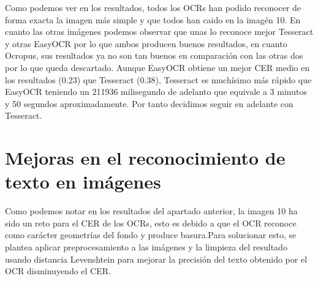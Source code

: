 Como podemos ver en los resultados, todos los OCRs han podido reconocer de forma exacta la imagen más simple y que todos han caido en la imagén 10. En cuanto las otras imágenes podemos observar que unas lo reconoce mejor Tesseract y otras EasyOCR por lo que ambos producen buenos resultados, en cuanto Ocropus, sus resultados ya no son tan buenos en comparación con las otras dos por lo que queda descartado. Aunque EasyOCR obtiene un mejor CER medio en los resultados (0.23) que Tesseract (0.38), Tesseract es muchísimo más rápido que EasyOCR teniendo un 211936 milisegundo de adelanto que equivale a 3 minutos y 50 segundos aproximadamente. Por tanto decidimos seguir en adelante con Tesseract.



\section{Mejoras en el reconocimiento de texto en imágenes}
\label{sec:Mejoras en el reconocimiento}
Como podemos notar en los resultados del apartado anterior, la imagen 10 ha sido un reto para el CER de los OCRs, esto es debido a que el OCR reconoce como carácter geometrías del fondo y produce basura.Para solucionar esto, se plantea aplicar preprocesamiento a las imágenes y la limpieza del resultado usando distancia Levenshtein para mejorar la precisión del texto obtenido por el OCR disminuyendo el CER.

